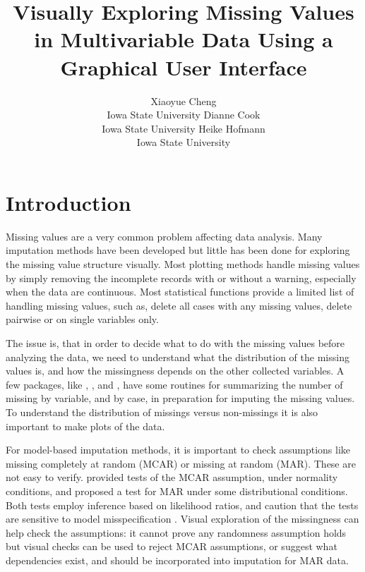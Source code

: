 \documentclass[article]{jss}
\author{Xiaoyue Cheng\\Iowa State University \And 
        Dianne Cook\\Iowa State University \And
        Heike Hofmann\\Iowa State University}
\title{Visually Exploring Missing Values in Multivariable Data 
       Using a Graphical User Interface}
\begin{document}
\section{Introduction}\label{introduction}

Missing values are a very common problem affecting data analysis.
Many imputation methods have been developed but little has been
done for exploring the missing value structure visually. Most
plotting methods handle missing values by simply removing the
incomplete records with or without a warning, especially when
the data are continuous. Most statistical functions provide a
limited list of handling missing values, such as, delete all cases
with any missing values, delete pairwise or on single variables only.

The issue is, that in order to decide what to do with the missing
values before analyzing the data, we need to understand what the
distribution of the missing values is, and how the missingness
depends on the other collected variables. A few 
packages, like  \citep{hmisc},  \citep{norm},
and  \citep{mice}, have some routines for summarizing
the number of missing by variable, and by case, in preparation
for imputing the missing values. To understand the distribution
of missings versus non-missings it is also important to make plots
of the data.

For model-based imputation methods, it is important to check
assumptions like missing completely at random (MCAR) or missing
at random (MAR). These are not easy to verify. \citet{little1988test}
provided tests of the MCAR assumption, under normality conditions,
and \citet{jaeger2006testing} proposed a test for MAR under some
distributional conditions. Both tests employ inference based on
likelihood ratios, and caution that the tests are sensitive to
model misspecification \citep{little1988test}. Visual exploration
of the missingness can help check the assumptions: it cannot prove
any randomness assumption holds but visual checks can be used to
reject MCAR assumptions, or suggest what dependencies exist, and
should be incorporated into imputation for MAR data.
\end{document}
